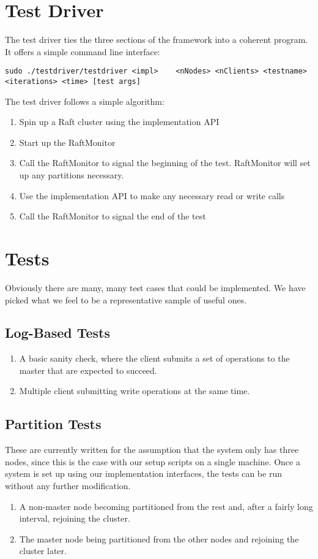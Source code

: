\documentclass[UTF8]{article}
\begin{document}
\section{Test Driver}
The test driver ties the three sections of the framework into a coherent program. It offers a simple command line interface:
\begin{lstlisting}
sudo ./testdriver/testdriver <impl>    <nNodes> <nClients> <testname>  <iterations> <time> [test args]
\end{lstlisting}
The test driver follows a simple algorithm:
\begin{enumerate}
  \item Spin up a Raft cluster using the implementation API
  \item Start up the RaftMonitor
  \item Call the RaftMonitor to signal the beginning of the test. RaftMonitor will set up any partitions necessary.
  \item Use the implementation API to make any necessary read or write calls
  \item Call the RaftMonitor to signal the end of the test
\end{enumerate}

\section{Tests}
Obviously there are many, many test cases that could be implemented. We have picked what we feel to be a representative sample of useful ones.
\subsection{Log-Based Tests}
\begin{enumerate}
  \item A basic sanity check, where the client submits a set of operations to the master that are expected to succeed.
  \item Multiple client submitting write operations at the same time.
\end{enumerate}
\subsection{Partition Tests}
These are currently written for the assumption that the system only has three nodes, since this is the case with our setup scripts on a single machine. Once a system is set up using our implementation interfaces, the tests can be run without any further modification. 
\begin{enumerate}
  \item A non-master node becoming partitioned from the rest and, after a fairly long interval, rejoining the cluster.
  \item The master node being partitioned from the other nodes and rejoining the cluster later.
\end{enumerate}
\end{document}
